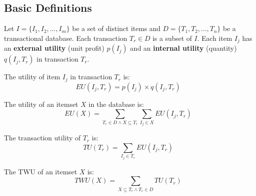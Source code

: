 \subsection{Basic Definitions}

Let $I = \{I_1, I_2, \ldots, I_m\}$ be a set of distinct items and $D = \{T_1, T_2, \ldots, T_n\}$ be a transactional database. Each transaction $T_r \in D$ is a subset of $I$. Each item $I_j$ has an \textbf{external utility} (unit profit) $p(I_j)$ and an \textbf{internal utility} (quantity) $q(I_j, T_r)$ in transaction $T_r$.

\begin{definition}
The utility of item $I_j$ in transaction $T_r$ is:
\begin{equation}
    EU(I_j, T_r) = p(I_j) \times q(I_j, T_r)
\end{equation}
\end{definition}

\begin{definition}
The utility of an itemset $X$ in the database is:
\begin{equation}
    EU(X) = \sum_{T_r \in D \wedge X \subseteq T_r} \sum_{I_j \in X} EU(I_j, T_r)
\end{equation}
\end{definition}

\begin{definition}
The transaction utility of $T_r$ is:
\begin{equation}
    TU(T_r) = \sum_{I_j \in T_r} EU(I_j, T_r)
\end{equation}
\end{definition}

\begin{definition}
The TWU of an itemset $X$ is:
\begin{equation}
    TWU(X) = \sum_{X \subseteq T_r \wedge T_r \in D} TU(T_r)
\end{equation}
\end{definition}